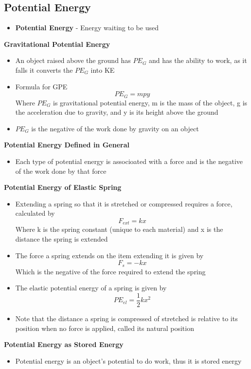 \subsection{Potential Energy}
\begin{itemize}
    \item \textbf{Potential Energy} - Energy waiting to be used
\end{itemize}

\textbf{Gravitational Potential Energy}
\begin{itemize}
    \item An object raised above the ground has \(PE_G\) and has the ability to work, as it falls it converts the \(PE_G\) into KE
    \item Formula for GPE \[PE_G=mpy\]
    Where \(PE_G\) is gravitational potential energy, m is the mass of the object, g is the acceleration due to gravity, and y is its height above the ground
    \item \(PE_G\) is the negative of the work done by gravity on an object
\end{itemize}

\textbf{Potential Energy Defined in General}
\begin{itemize}
    \item Each type of potential energy is associoated with a force and is the negative of the work done by that force
\end{itemize}

\textbf{Potential Energy of Elastic Spring}
\begin{itemize}
    \item Extending a spring so that it is stretched or compressed requires a force, calculated by \[F_{ext}=kx\] Where k is the spring constant (unique to each material) and x is the distance the spring is extended
    \item The force a spring extends on the item extending it is given by \[F_s=-kx\]
    Which is the negative of the force required to extend the spring
    \item The elastic potential energy of a spring is given by \[PE_{el}=\frac{1}{2}kx^2\]
    \item Note that the distance a spring is compressed of stretched is relative to its position when no force is applied, called its natural position
\end{itemize}

\textbf{Potential Energy as Stored Energy}
\begin{itemize}
    \item Potential energy is an object's potential to do work, thus it is stored energy
\end{itemize}


